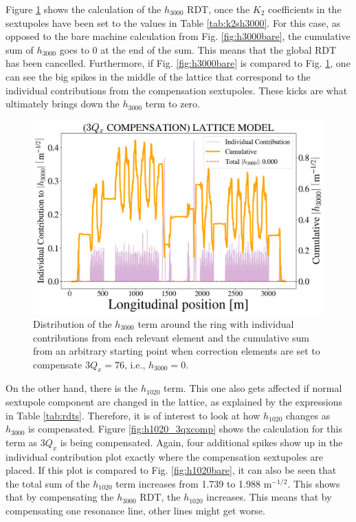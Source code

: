 Figure \ref{fig:h3000_3qxcomp} shows the calculation of the $h_{3000}$ RDT, once the $K_2$ coefficients in the sextupoles have been set to the values in Table \ref{tab:k2sh3000}. For this case, as opposed to the bare machine calculation from Fig. \ref{fig:h3000bare}, the cumulative sum of $h_{3000}$ goes to 0 at the end of the sum. This means that the global RDT has been cancelled. Furthermore, if Fig. \ref{fig:h3000bare} is compared to Fig. \ref{fig:h3000_3qxcomp}, one can see the big spikes in the middle of the lattice that correspond to the individual contributions from the compensation sextupoles. These kicks are what ultimately brings down the $h_{3000}$ term to zero. 

\begin{figure}[H]
    \centering
    \includegraphics[width=\columnwidth]{chapter4/h3000_3qxcomp.png}
    \caption{Distribution of the $h_{3000}$ term around the ring with individual contributions from each relevant element and the cumulative sum from an arbitrary starting point when correction elements are set to compensate $3Q_x=76$, i.e., $h_{3000}=0$.}
    \label{fig:h3000_3qxcomp}
\end{figure}

On the other hand, there is the $h_{1020}$ term. This one also gets affected if normal sextupole component are changed in the lattice, as explained by the expressions in Table \ref{tab:rdts}. Therefore, it is of interest to look at how $h_{1020}$ changes as $h_{3000}$ is compensated. Figure \ref{fig:h1020_3qxcomp} shows the calculation for this term as $3Q_x$ is being compensated. Again, four additional spikes show up in the individual contribution plot exactly where the compensation sextupoles are placed. If this plot is compared to Fig. \ref{fig:h1020bare}, it can also be seen that the total sum of the $h_{1020}$ term increases from 1.739 to 1.988 m$^{-1/2}$. This shows that by compensating the $h_{3000}$ RDT, the $h_{1020}$ increases. This means that by compensating one resonance line, other lines might get worse. 

